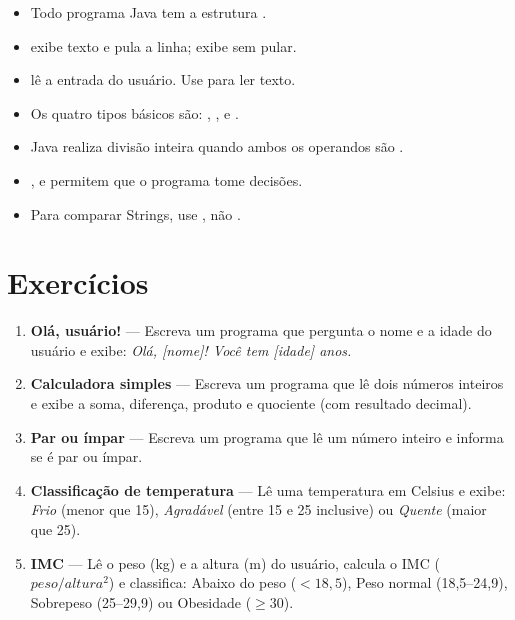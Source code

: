 \documentclass[11pt,a4paper]{article}
\begin{document}
\begin{itemize}
  \item Todo programa Java tem a estrutura .
  \item {} exibe texto e pula a linha;  exibe sem pular.
  \item {} lê a entrada do usuário. Use  para ler texto.
  \item Os quatro tipos básicos são: , ,  e .
  \item Java realiza divisão inteira quando ambos os operandos são .
  \item {},  e  permitem que o programa tome decisões.
  \item Para comparar Strings, use , não \inlinecode{==}.
\end{itemize}

\section{Exercícios}

\begin{enumerate}
  \item \textbf{Olá, usuário!} — Escreva um programa que pergunta o nome e a idade do usuário e exibe: \textit{Olá, [nome]! Você tem [idade] anos.}

  \item \textbf{Calculadora simples} — Escreva um programa que lê dois números inteiros e exibe a soma, diferença, produto e quociente (com resultado decimal).

  \item \textbf{Par ou ímpar} — Escreva um programa que lê um número inteiro e informa se é par ou ímpar.

  \item \textbf{Classificação de temperatura} — Lê uma temperatura em Celsius e exibe: \textit{Frio} (menor que 15), \textit{Agradável} (entre 15 e 25 inclusive) ou \textit{Quente} (maior que 25).

  \item \textbf{IMC} — Lê o peso (kg) e a altura (m) do usuário, calcula o IMC (\(peso / altura^2\)) e classifica: Abaixo do peso ($< 18{,}5$), Peso normal (18,5–24,9), Sobrepeso (25–29,9) ou Obesidade ($\geq 30$).
\end{enumerate}
\end{document}
